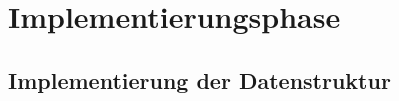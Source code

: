 \newpage
\section{Implementierungsphase}
\label{implementierungsphase}
\begin{comment}
	In Implementierung verlagern
	
	Beim Speichern wird über mehrere anliegende Systeme ein Angebot in einer Datenbank gespeichert. Wichtig ist dabei die Session, welche von einem der Systeme generiert wird, realisiert als \ac{GUID}. Mithilfe dieser wird ein Angebot im XML-Format in einer Datenbank gespeichert und ist dadurch eindeutig identifizierbar.\\
	
	Dies beinhaltet die gleiche Logik wie die Angebotsspeicherung, bis auf dass eine neue \ac{GUID} erzeugt wird, wodurch dementsprechend ein neuer Eintrag in der Datenbank und im Maklerportal hinterlegt wird. Außerdem muss mit der \ac{GUID}, bzw. Session der Kopie weitergearbeitet werden.\\
	
	
	Hier könnte man den Pinia store erwähnen und die Werte, die die Buttons steuern, ob diese Sichtbar sind bzw. aktiv oder inaktiv.
\end{comment} 

\subsection{Implementierung der Datenstruktur}
\label{datenstruktur}

